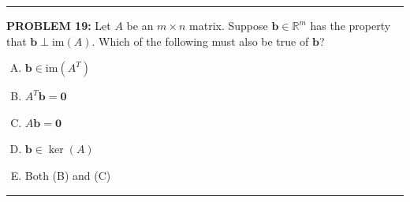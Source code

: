 \documentclass[12pt]{amsart}
\newcommand{\divider}{
  \vspace{-1em} %
  \noindent
  \raisebox{-0.15ex}{\textbullet}%
  \hspace{0.5em}%
  \rule[0.5ex]{0.95\textwidth}{1.0pt}%
  \hspace{0.5em}%
  \raisebox{-0.15ex}{\textbullet}%
  \vspace{0em} %
}
\begin{document}

\divider

{\bf PROBLEM 19:}
%
Let $A$ be an $m \times n$ matrix.  
Suppose $\mathbf{b} \in \mathbb{R}^m$ has the property that $\mathbf{b} \perp \mathrm{im}(A)$.  
Which of the following must also be true of $\mathbf{b}$?
%
\begin{enumerate}[(A)]
\item $\mathbf{b} \in \mathrm{im}(A^T)$
\item $A^T \mathbf{b} = \mathbf{0}$
\item $A \mathbf{b} = \mathbf{0}$
\item $\mathbf{b} \in \ker(A)$
\item Both (B) and (C)
\end{enumerate}
%
%
%
%
%
\divider
\end{document}
